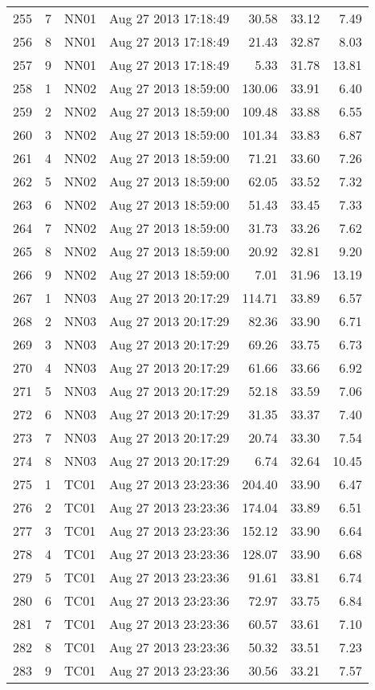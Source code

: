 \begin{longtable}{ccllrrr}
255&7&NN01&Aug 27 2013 17:18:49&30.58&33.12&7.49\\
256&8&NN01&Aug 27 2013 17:18:49&21.43&32.87&8.03\\
257&9&NN01&Aug 27 2013 17:18:49&5.33&31.78&13.81\\
\hline 
258&1&NN02&Aug 27 2013 18:59:00&130.06&33.91&6.40\\
259&2&NN02&Aug 27 2013 18:59:00&109.48&33.88&6.55\\
260&3&NN02&Aug 27 2013 18:59:00&101.34&33.83&6.87\\
261&4&NN02&Aug 27 2013 18:59:00&71.21&33.60&7.26\\
262&5&NN02&Aug 27 2013 18:59:00&62.05&33.52&7.32\\
263&6&NN02&Aug 27 2013 18:59:00&51.43&33.45&7.33\\
264&7&NN02&Aug 27 2013 18:59:00&31.73&33.26&7.62\\
265&8&NN02&Aug 27 2013 18:59:00&20.92&32.81&9.20\\
266&9&NN02&Aug 27 2013 18:59:00&7.01&31.96&13.19\\
\hline 
267&1&NN03&Aug 27 2013 20:17:29&114.71&33.89&6.57\\
268&2&NN03&Aug 27 2013 20:17:29&82.36&33.90&6.71\\
269&3&NN03&Aug 27 2013 20:17:29&69.26&33.75&6.73\\
270&4&NN03&Aug 27 2013 20:17:29&61.66&33.66&6.92\\
271&5&NN03&Aug 27 2013 20:17:29&52.18&33.59&7.06\\
272&6&NN03&Aug 27 2013 20:17:29&31.35&33.37&7.40\\
273&7&NN03&Aug 27 2013 20:17:29&20.74&33.30&7.54\\
274&8&NN03&Aug 27 2013 20:17:29&6.74&32.64&10.45\\
\hline 
275&1&TC01&Aug 27 2013 23:23:36&204.40&33.90&6.47\\
276&2&TC01&Aug 27 2013 23:23:36&174.04&33.89&6.51\\
277&3&TC01&Aug 27 2013 23:23:36&152.12&33.90&6.64\\
278&4&TC01&Aug 27 2013 23:23:36&128.07&33.90&6.68\\
279&5&TC01&Aug 27 2013 23:23:36&91.61&33.81&6.74\\
280&6&TC01&Aug 27 2013 23:23:36&72.97&33.75&6.84\\
281&7&TC01&Aug 27 2013 23:23:36&60.57&33.61&7.10\\
282&8&TC01&Aug 27 2013 23:23:36&50.32&33.51&7.23\\
283&9&TC01&Aug 27 2013 23:23:36&30.56&33.21&7.57\\

\end{longtable}
